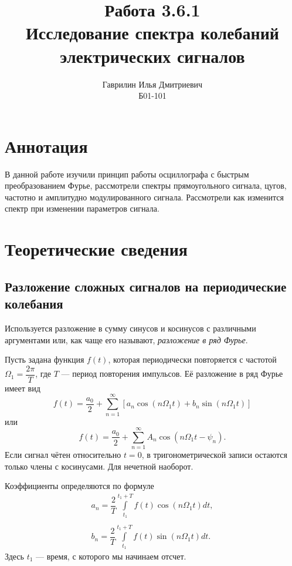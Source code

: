 \documentclass[a4paper, 12pt]{article}%
\author{Гаврилин Илья Дмитриевич \\
	Б01-101}
\title{\textbf{Работа 3.6.1 \\ 
		Исследование спектра колебаний электрических сигналов}}
\begin{document}
	\maketitle
	\section{Аннотация}
	В данной работе изучили принцип работы осциллографа с быстрым преобразованием Фурье, рассмотрели спектры прямоугольного сигнала, цугов, частотно и амплитудно модулированного сигнала. Рассмотрели как изменится спектр при изменении параметров сигнала.
	\section{Теоретические сведения}
	\subsection*{Разложение сложных сигналов на периодические колебания}
	Используется разложение в сумму синусов и косинусов с различными аргументами или, как чаще его называют, \textit{разложение в ряд Фурье}.
	
	Пусть задана функция $f(t)$, которая периодически повторяется с частотой $\Omega_1 = \dfrac{2\pi}{T}$, где $T$ --- период повторения импульсов. Её разложение в ряд Фурье имеет вид 
	\begin{equation}
		f(t) = \dfrac{a_0}{2} + \sum\limits_{n = 1}^{\infty}\left[a_n \cos \left(n \Omega_1t\right) + b_n \sin \left(n \Omega_1t\right)\right]
	\end{equation}
	или
	\begin{equation}
		f(t) = \dfrac{a_0}{2} + \sum\limits_{n = 1}^{\infty}A_n \cos \left(n\Omega_1t-\psi_n\right).
	\end{equation}
	Если сигнал чётен относительно $t=0$, в тригонометрической записи остаются только члены с косинусами. Для нечетной наоборот.
	
	Коэффициенты определяются по формуле
	\begin{equation}
		\begin{array}{c}
			a_n  = \dfrac{2}{T}\int\limits_{t_1}^{t_1+T}f(t)\cos\left(n \Omega_1 t\right) dt,\\
			\\
			b_n = \dfrac{2}{T}\int\limits_{t_1}^{t_1+T}f(t)\sin\left(n \Omega_1 t\right) dt.
		\end{array}
	\end{equation}
	Здесь $t_1$ --- время, с которого мы начинаем отсчет.
	
\end{document}
